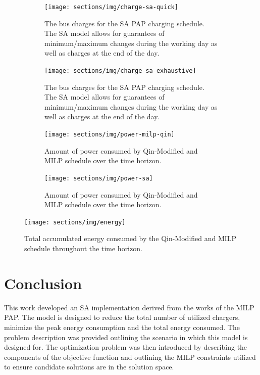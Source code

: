 \documentclass[11pt,a4paper,final]{article}
\begin{document}
\begin{figure}\ContinuedFloat
  \begin{subfigure}[t]{\textwidth}
    \centering
    \texttt{[image: sections/img/charge-sa-quick]}
    \caption{The bus charges for the SA PAP charging schedule. The SA model allows for guarantees of minimum/maximum changes during the working day as well as charges at the end of the day.}
    \label{subfig:sa-quick-charge}
  \end{subfigure}
  \hfill
  \begin{subfigure}[t]{\textwidth}
    \centering
    \texttt{[image: sections/img/charge-sa-exhaustive]}
    \caption{The bus charges for the SA PAP charging schedule. The SA model allows for guarantees of minimum/maximum changes during the working day as well as charges at the end of the day.}
    \label{subfig:sa-exhaustive-charge}
  \end{subfigure}
  \caption{}
  \label{fig:charge}
\end{figure}

\begin{figure}
  \begin{subfigure}[t]{\textwidth}
    \centering
    \texttt{[image: sections/img/power-milp-qin]}
    \caption{Amount of power consumed by Qin-Modified and MILP schedule over the time horizon.}
    \label{fig:power-usage-milp-qin}
  \end{subfigure}

  \hfill

  \begin{subfigure}[t]{\textwidth}
    \centering
    \texttt{[image: sections/img/power-sa]}
    \caption{Amount of power consumed by Qin-Modified and MILP schedule over the time horizon.}
    \label{fig:power-usage-sa}
  \end{subfigure}
  \caption{}
  \label{fig:power}
\end{figure}

\begin{figure}[htpb]
\centering \texttt{[image: sections/img/energy]}
    \caption{Total accumulated energy consumed by the Qin-Modified and MILP schedule throughout the time horizon.}
    \label{fig:energy-usage}
\end{figure}
\newpage

\section{Conclusion}
\label{sec:conclusion}
This work developed an SA implementation derived from the works of the MILP PAP. The model is designed to reduce the
total number of utilized chargers, minimize the peak energy consumption and the total energy consumed. The problem
description was provided outlining the scenario in which this model is designed for. The optimization problem was then
introduced by describing the components of the objective function and outlining the MILP constraints utilized to ensure
candidate solutions are in the solution space.
\end{document}
